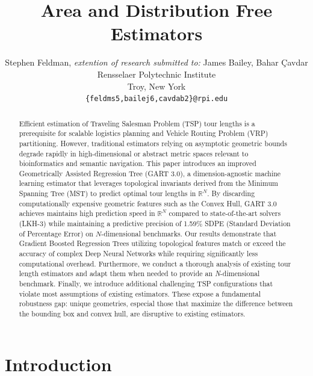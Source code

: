 \documentclass{article}
\title{Area and Distribution Free Estimators
}
\author{
  Stephen Feldman, \textit{extention of research submitted to:} James Bailey, Bahar \c{C}avdar \\
  Rensselaer Polytechnic Institute \\
  Troy, New York\\
  \texttt{\{feldms5,bailej6,cavdab2\}@rpi.edu} \\
}
\begin{document}
\maketitle


\begin{abstract}
Efficient estimation of Traveling Salesman Problem (TSP) tour lengths is a prerequisite for scalable logistics planning and Vehicle Routing Problem (VRP) partitioning. However, traditional estimators relying on asymptotic geometric bounds degrade rapidly in high-dimensional or abstract metric spaces relevant to bioinformatics and semantic navigation. This paper introduces an improved Geometrically Assisted Regression Tree (GART 3.0), a dimension-agnostic machine learning estimator that leverages topological invariants derived from the Minimum Spanning Tree (MST) to predict optimal tour lengths in $\mathbb{R}^N$. By discarding computationally expensive geometric features such as the Convex Hull, GART 3.0 achieves maintains high prediction speed in $\mathbb{R}^N$ compared to state-of-the-art solvers (LKH-3) while maintaining a predictive precision of 1.59\% SDPE (Standard Deviation of Percentage Error) on $N$-dimensional benchmarks. Our results demonstrate that Gradient Boosted Regression Trees utilizing topological features match or exceed the accuracy of complex Deep Neural Networks while requiring significantly less computational overhead. Furthermore, we conduct a thorough analysis of existing tour length estimators and adapt them when needed to provide an \textit{N}-dimensional benchmark. Finally, we introduce additional challenging TSP configurations that violate most assumptions of existing estimators. These expose a fundamental robustness gap: unique geometries, especial those that maximize the difference between the bounding box and convex hull, are disruptive to existing estimators.
\end{abstract}




\section{Introduction}
\label{sec:introduction}
\end{document}

